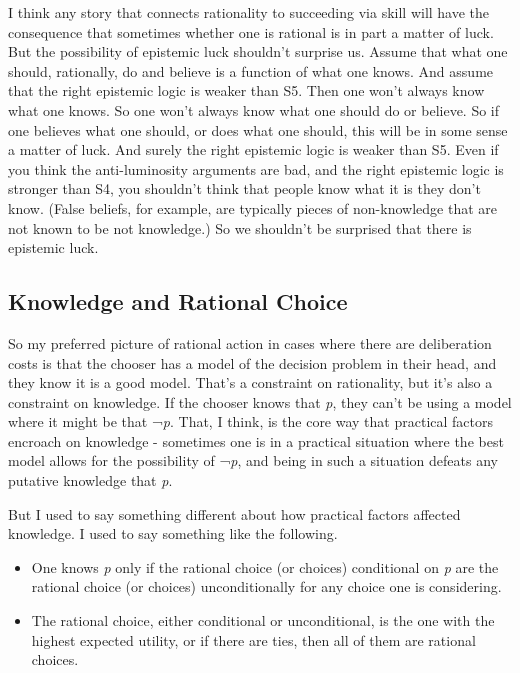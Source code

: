 \documentclass[
  11pt,
  letterpaper,
  DIV=11,
  numbers=noendperiod,
  twoside]{scrartcl}
\providecommand{\tightlist}{%
  \setlength{\itemsep}{0pt}\setlength{\parskip}{0pt}}\usepackage{longtable,booktabs,array}
\begin{document}
I think any story that connects rationality to succeeding via skill will
have the consequence that sometimes whether one is rational is in part a
matter of luck. But the possibility of epistemic luck shouldn't surprise
us. Assume that what one should, rationally, do and believe is a
function of what one knows. And assume that the right epistemic logic is
weaker than S5. Then one won't always know what one knows. So one won't
always know what one should do or believe. So if one believes what one
should, or does what one should, this will be in some sense a matter of
luck. And surely the right epistemic logic is weaker than S5. Even if
you think the anti-luminosity arguments are bad, and the right epistemic
logic is stronger than S4, you shouldn't think that people know what it
is they don't know. (False beliefs, for example, are typically pieces of
non-knowledge that are not known to be not knowledge.) So we shouldn't
be surprised that there is epistemic luck.

\subsection{Knowledge and Rational Choice}\label{knowledge}

So my preferred picture of rational action in cases where there are
deliberation costs is that the chooser has a model of the decision
problem in their head, and they know it is a good model. That's a
constraint on rationality, but it's also a constraint on knowledge. If
the chooser knows that \emph{p}, they can't be using a model where it
might be that ¬\emph{p}. That, I think, is the core way that practical
factors encroach on knowledge - sometimes one is in a practical
situation where the best model allows for the possibility of ¬\emph{p},
and being in such a situation defeats any putative knowledge that
\emph{p}.

But I used to say something different about how practical factors
affected knowledge. I used to say something like the following.

\begin{itemize}
\tightlist
\item
  One knows \emph{p} only if the rational choice (or choices)
  conditional on \emph{p} are the rational choice (or choices)
  unconditionally for any choice one is considering.
\item
  The rational choice, either conditional or unconditional, is the one
  with the highest expected utility, or if there are ties, then all of
  them are rational choices.
\end{itemize}
\end{document}
